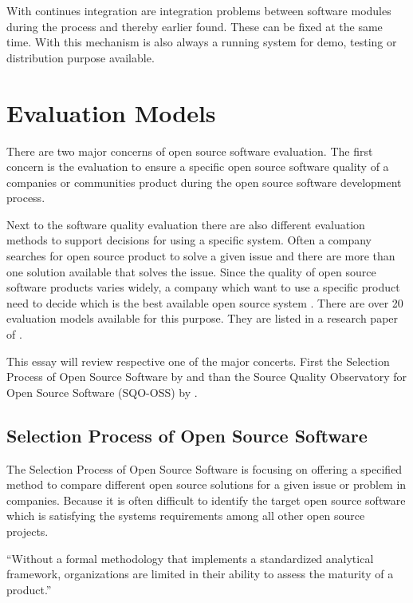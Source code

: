 \documentclass[DIV=calc,paper=a4,fontsize=9pt,twocolumn]{scrartcl}
\begin{document}
With continues integration are integration problems between software modules during the process and thereby earlier found. These can be fixed at the same time. With this mechanism is also always a running system for demo, testing or distribution purpose available.

\section{Evaluation Models}

There are two major concerns of open source software evaluation. The first concern is the evaluation to ensure a specific open source software quality of a companies or communities product during the open source software development process. 

Next to the software quality evaluation there are also different evaluation methods to support decisions for using a specific system. Often a company searches for open source product to solve a given issue and there are more than one solution available that solves the issue. Since the quality of open source software products varies widely, a company which want to use a specific product need to decide which is the best available open source system \citep{stol2010comparison}. There are over 20 evaluation models available for this purpose. They are listed in a research paper of \citet{stol2010comparison}.

This essay will review respective one of the major concerts. First the Selection Process of Open Source Software by \citet{lee2007study} and than the Source Quality Observatory for Open Source Software (SQO-OSS) by \citet{samoladas2008sqo}.

\subsection{Selection Process of Open Source Software}

The Selection Process of Open Source Software is focusing on offering a specified method to compare different open source solutions for a given issue or problem in companies. Because it is often difficult to identify the target open source software which is satisfying the systems requirements among all other open source projects. \citep{lee2007study}

\enquote{Without a formal methodology that implements a standardized analytical framework, organizations are limited in their ability to assess the maturity of a product.} \citep{golden08}
\end{document}
